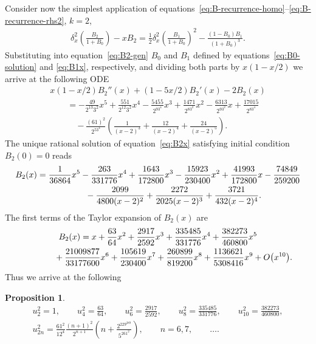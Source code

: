 \documentclass[pdftex]{sigma}
\numberwithin{equation}{section}
\newtheorem{Proposition}[Theorem]{Proposition}
 { \theoremstyle{definition}
\newtheorem{Remark}[Theorem]{Remark} }
\begin{document}
Consider now the simplest application of equations~\eqref{eq:B-recurrence-homo}--\eqref{eq:B-recurrence-rhs2}, $k=2$,
\begin{gather}\label{eq:B2-gen}
\delta_x^2\left(\frac{B_2}{1+B_0}\right)-xB_2=\frac12\delta_x^2\left(\frac{B_1}{1+B_0}\right)^2-\frac{(1-B_0)B_1}{(1+B_0)^3}.
\end{gather}
Substituting into equation~\eqref{eq:B2-gen} $B_0$ and $B_1$ defined by equations~\eqref{eq:B0-solution} and \eqref{eq:B1x}, respectively,
and dividing both parts by $x(1-x/2)$ we arrive at the following ODE
\begin{gather}
x(1-x/2)B_2''(x)+(1-5x/2)B_2'(x)-2B_2(x)\nonumber\\
\qquad{}= -\frac{49}{2^{13}3^2}x^5+\frac{551}{2^{12}3^2}x^4-\frac{5455}{2^93^4}x^3+\frac{1471}{2^83^2}x^2-\frac{6313}{2^93^2}x+\frac{17015}{2^83^4}\nonumber\\
\qquad\quad {} -\frac{(61)^2}{2^53^4}\left(\frac{1}{(x-2)^3}+\frac{12}{(x-2)^4}+\frac{24}{(x-2)^5}\right).\label{eq:B2x}
\end{gather}
The unique rational solution of equation~\eqref{eq:B2x} satisfying initial condition $B_2(0)=0$ reads
\begin{gather*}
B_2(x) =\frac{1}{36864}x^5-\frac{263}{331776}x^4+\frac{1643}{172800}x^3-\frac{15923}{230400}x^2+\frac{41993}{172800}x-\frac{74849}{259200}\\
\hphantom{B_2(x) =}{} -\frac{2099}{4800(x-2)^2}+\frac{2272}{2025(x-2)^3}+\frac{3721}{432(x-2)^4}.
\end{gather*}
The first terms of the Taylor expansion of $B_2(x)$ are
\begin{gather*}
B_2(x) =x+\frac{63}{64}x^2+\frac{2917}{2592}x^3+\frac{335485}{331776}x^4+\frac{382273}{460800}x^5\\
\hphantom{B_2(x) =}{} +\frac{21009877}{33177600}x^6+\frac{105619}{230400}x^7+\frac{260899}{819200}x^8+\frac{1136621}{5308416}x^9+O\big(x^{10}\big).
\end{gather*}
Thus we arrive at the following
\begin{Proposition}
\begin{gather*}
 u_2^2=1,\qquad
u_4^2=\frac{63}{64},\qquad
u_6^2=\frac{2917}{2592},\qquad
u_8^2=\frac{335485}{331776},\qquad
u_{10}^2=\frac{382273}{460800},\\
 u_{2n}^2=\frac{61^2}{12^4}\frac{(n+1)^2}{2^{n+1}}\left(n+\frac{2^229^289}{5^261^2}\right),\qquad n=6,7, \qquad \ldots.
\end{gather*}
\end{Proposition}
\end{document}
